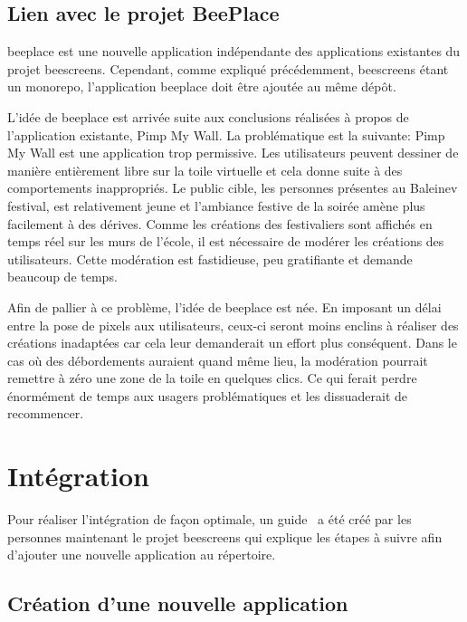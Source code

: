 \subsection{Lien avec le projet BeePlace}
\label{sec:lien-avec-le-projet-beeplace}

\gls{beeplace} est une nouvelle application indépendante des applications existantes du projet \gls{beescreens}. Cependant, comme expliqué précédemment, \gls{beescreens} étant un monorepo, l'application \gls{beeplace} doit être ajoutée au même dépôt.

L'idée de \gls{beeplace} est arrivée suite aux conclusions réalisées à propos de l'application existante, Pimp My Wall. La problématique est la suivante: Pimp My Wall est une application trop permissive. Les utilisateurs peuvent dessiner de manière entièrement libre sur la toile virtuelle et cela donne suite à des comportements inappropriés. Le public cible, les personnes présentes au Baleinev festival, est relativement jeune et l'ambiance festive de la soirée amène plus facilement à des dérives. Comme les créations des festivaliers sont affichés en temps réel sur les murs de l'école, il est nécessaire de modérer les créations des utilisateurs. Cette modération est fastidieuse, peu gratifiante et demande beaucoup de temps.

Afin de pallier à ce problème, l'idée de \gls{beeplace} est née. En imposant un délai entre la pose de pixels aux utilisateurs, ceux-ci seront moins enclins à réaliser des créations inadaptées car cela leur demanderait un effort plus conséquent. Dans le cas où des débordements auraient quand même lieu, la modération pourrait remettre à zéro une zone de la toile en quelques clics. Ce qui ferait perdre énormément de temps aux usagers problématiques et les dissuaderait de recommencer.

\section{Intégration}

Pour réaliser l'intégration de façon optimale, un guide~\cite{addapptobeescreens} a été créé par les personnes maintenant le projet \gls{beescreens} qui explique les étapes à suivre afin d'ajouter une nouvelle application au répertoire.

\subsection{Création d'une nouvelle application}

